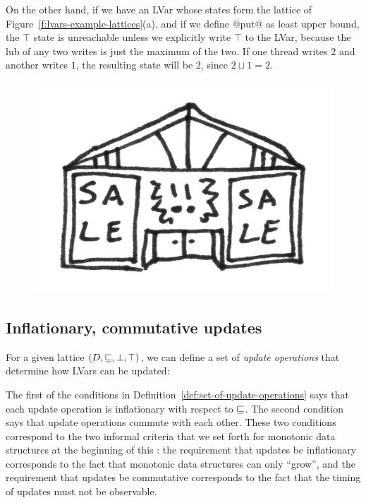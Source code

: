 On the other hand, if we have an LVar whose states form the lattice of
Figure~\ref{f:lvars-example-lattices}(a), and if we define @put@ as
least upper bound, the $\top$ state is unreachable unless we
explicitly write $\top$ to the LVar, because the lub of any two writes
is just the maximum of the two.  If one thread writes $2$ and another
writes $1$, the resulting state will be $2$, since $2 \sqcup 1 = 2$.

\ifdefined\DISSERTATION
\begin{figure}
\vspace{-2em}
\begin{center}
  \includegraphics[scale=0.15]{../illustrations/store}
\end{center}
\vspace{-2em}
\end{figure}
\fi

\subsection{Inflationary, commutative updates}

For a given lattice $(D, \sqsubseteq, \bot, \top)$, we can define a set
of \emph{update operations} that determine how LVars can be updated:

\DefSetOfUpdateOperations
%
The first of the conditions in
Definition~\ref{def:set-of-update-operations} says that each update
operation is inflationary with respect to $\sqsubseteq$.  The second
condition says that update operations commute with each other.  These
two conditions correspond to the two informal criteria that we set
forth for monotonic data structures at the beginning of this
: the requirement that updates be
inflationary corresponds to the fact that monotonic data structures
can only ``grow'', and the requirement that updates be commutative
corresponds to the fact that the timing of updates must not be
observable.

